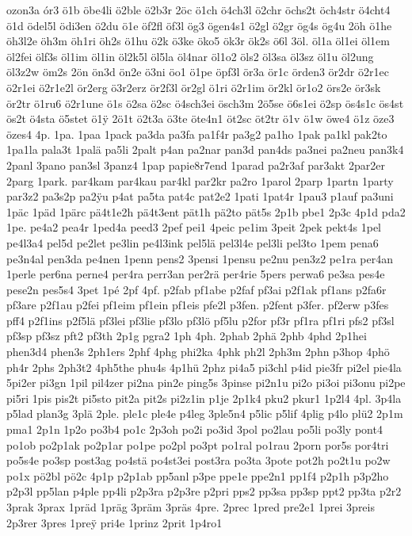 {ozon3a
ór3
ö1b
öbe4li
ö2ble
ö2b3r
2öc
ö1ch
ö4ch3l
ö2chr
öchs2t
öch4str
ö4cht4
ö1d
ödel5l
ödi3en
ö2du
ö1e
öf2fl
öf3l
ög3
ögen4s1
ö2gl
ö2gr
ög4s
ög4u
2öh
ö1he
öh3l2e
öh3m
öh1ri
öh2s
ö1hu
ö2k
ö3ke
öko5
ök3r
ök2s
ö6l
3öl.
öl1a
öl1ei
öl1em
öl2fei
ölf3s
öl1im
öl1in
öl2k5l
öl5la
öl4nar
öl1o2
öls2
öl3sa
öl3sz
öl1u
öl2ung
öl3z2w
öm2s
2ön
ön3d
ön2e
ö3ni
öo1
ö1pe
öpf3l
ör3a
ör1c
örden3
ör2dr
ö2r1ec
ö2r1ei
ö2r1e2l
ör2erg
ö3r2erz
ör2f3l
ör2gl
ö1ri
ö2r1im
ör2kl
ör1o2
örs2e
ör3sk
ör2tr
ö1ru6
ö2r1une
ö1s
ö2sa
ö2sc
ö4sch3ei
ösch3m
2ö5se
ö6s1ei
ö2sp
ös4s1c
ös4st
ös2t
ö4sta
ö5stet
ö1^^ff
2ö1t
ö2t3a
ö3te
öte4n1
öt2sc
öt2tr
ö1v
ö1w
öwe4
ö1z
öze3
özes4
4p.
1pa.
1paa
1pack
pa3da
pa3fa
pa1f4r
pa3g2
pa1ho
1pak
pa1kl
pak2to
1pa1la
pala3t
1palä
pa5li
2palt
p4an
pa2nar
pan3d
pan4ds
pa3nei
pa2neu
pan3k4
2panl
3pano
pan3sl
3panz4
1pap
papie8r7end
1parad
pa2r3af
par3akt
2par2er
2parg
1park.
par4kam
par4kau
par4kl
par2kr
pa2ro
1parol
2parp
1partn
1party
par3z2
pa3s2p
pa2^^ffu
p4at
pa5ta
pat4c
pat2e2
1pati
1pat4r
1pau3
p1auf
pa3uni
1päc
1päd
1pärc
pä4t1e2h
pä4t3ent
pät1h
pä2to
pät5s
2p1b
pbe1
2p3c
4p1d
pda2
1pe.
pe4a2
pea4r
1ped4a
peed3
2pef
pei1
4peic
pe1im
3peit
2pek
pekt4s
1pel
pe4l3a4
pel5d
pe2let
pe3lin
pe4l3ink
pel5lä
pel3l4e
pel3li
pel3to
1pem
pena6
pe3n4al
pen3da
pe4nen
1penn
pens2
3pensi
1pensu
pe2nu
pen3z2
pe1ra
per4an
1perle
per6na
perne4
per4ra
perr3an
per2rä
per4rie
5pers
perwa6
pe3sa
pes4e
pese2n
pes5s4
3pet
1pé
2pf
4pf.
p2fab
pf1abe
p2faf
pf3ai
p2f1ak
pf1ans
p2fa6r
pf3are
p2f1au
p2fei
pf1eim
pf1ein
pf1eis
pfe2l
p3fen.
p2fent
p3fer.
pf2erw
p3fes
pff4
p2f1ins
p2f5lä
pf3lei
pf3lie
pf3lo
pf3lö
pf5lu
p2for
pf3r
pf1ra
pf1ri
pfs2
pf3sl
pf3sp
pf3sz
pft2
pf3th
2p1g
pgra2
1ph
4ph.
2phab
2phä
2phb
4phd
2p1hei
phen3d4
phen3s
2ph1ers
2phf
4phg
phi2ka
4phk
ph2l
2ph3m
2phn
p3hop
4phö
ph4r
2phs
2ph3t2
4ph5the
phu4s
4p1hü
2phz
pi4a5
pi3chl
p4id
pie3fr
pi2el
pie4la
5pi2er
pi3gn
1pil
pil4zer
pi2na
pin2e
ping5s
3pinse
pi2n1u
pi2o
pi3oi
pi3onu
pi2pe
pi5ri
1pis
pis2t
pi5sto
pit2a
pit2s
pi2z1in
p1je
2p1k4
pku2
pkur1
1p2l4
4pl.
3p4la
p5lad
plan3g
3plä
2ple.
ple1c
ple4e
p4leg
3ple5n4
p5lic
p5lif
4plig
p4lo
plü2
2p1m
pma1
2p1n
1p2o
po3b4
po1c
2p3oh
po2i
po3id
3pol
po2lau
po5li
po3ly
pont4
po1ob
po2p1ak
po2p1ar
po1pe
po2pl
po3pt
po1ral
po1rau
2porn
por5s
por4tri
po5s4e
po3sp
post3ag
po4stä
po4st3ei
post3ra
po3ta
3pote
pot2h
po2t1u
po2w
po1x
pö2bl
pö2c
4p1p
p2p1ab
pp5anl
p3pe
ppe1e
ppe2n1
pp1f4
p2p1h
p3p2ho
p2p3l
pp5lan
p4ple
pp4li
p2p3ra
p2p3re
p2pri
pps2
pp3sa
pp3sp
ppt2
pp3ta
p2r2
3prak
3prax
1präd
1präg
3präm
3präs
4pre.
2prec
1pred
pre2e1
1prei
3preis
2p3rer
3pres
1pre^^ff
pri4e
1prinz
2prit
1p4ro1
}
